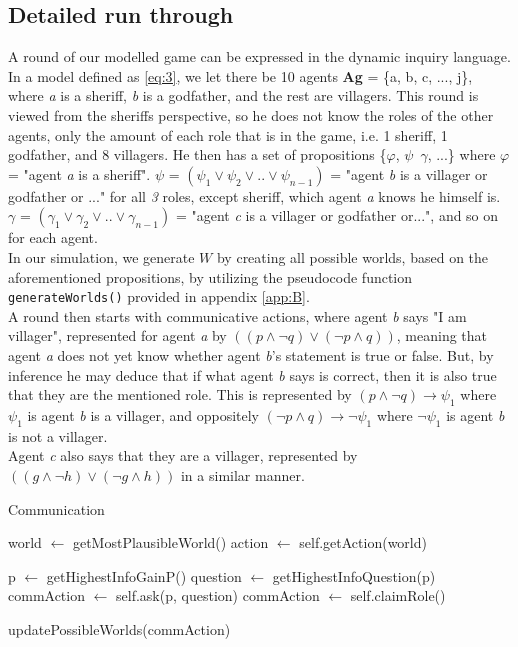 \subsection{Detailed run through}\label{ARoundOfTheGame}
A round of our modelled game can be expressed in the dynamic inquiry language.
In a model defined as \cref{eq:3}, we let there be 10 agents \textbf{Ag} = \{a,
b, c, ..., j\}, where \textit{a} is a sheriff, \textit{b} is a godfather, and
the rest are villagers. This round is viewed from the sheriffs perspective, so
he does not know the roles of the other agents, only the amount of each role
that is in the game, i.e. 1 sheriff, 1 godfather, and 8 villagers. He then has
a set of propositions \{$\varphi$, $\psi$\, $\gamma$, ...\} where $\varphi$ =
"agent \textit{a} is a sheriff". $\psi$ = $(\psi_1 \lor \psi_2 \lor .. \lor
	\psi_{n-1})$ = "agent \textit{b} is a villager or godfather or ..." for all
\textit{3} roles, except sheriff, which agent \textit{a} knows he himself is.
$\gamma$ = $(\gamma_1 \lor \gamma_2 \lor .. \lor \gamma_{n-1}) $ = "agent
\textit{c} is a villager or godfather or...", and so on for each agent. \\ In
our simulation, we generate $W$ by creating all possible worlds, based on the
aforementioned propositions, by utilizing the pseudocode function
\lstinline{generateWorlds()} provided in appendix \ref{app:B}. \\ A round then
starts with communicative actions, where agent \textit{b} says "I am villager",
represented for agent \textit{a} by $((p \land \neg q) \lor (\neg p \land q))$,
meaning that agent \textit{a} does not yet know whether agent \textit{b}'s
statement is true or false. But, by inference he may deduce that if what agent
\textit{b} says is correct, then it is also true that they are the mentioned
role. This is represented by $(p \land \neg q) \rightarrow \psi_1$ where
$\psi_1$ is agent \textit{b} is a villager, and oppositely $(\neg p \land q)
	\rightarrow \neg \psi_1$ where $\neg \psi_1$ is agent \textit{b} is not a
villager. \\ Agent \textit{c} also says that they are a villager, represented
by $((g \land \neg h) \lor (\neg g \land h))$ in a similar manner.

\begin{algorithm}
	\caption{Communication}
	\begin{algorithmic}[1]
		\State world $\gets$ getMostPlausibleWorld()
		\State action $\gets$ self.getAction(world)

		\State p $\gets$ getHighestInfoGainP()
		\State question $\gets$ getHighestInfoQuestion(p)
		\State commAction $\gets$ self.ask(p, question)
		\State commAction $\gets$ self.claimRole()
		\EndIf

		\State updatePossibleWorlds(commAction)
		\EndFunction
	\end{algorithmic}
\end{algorithm}\label{lst:communicate}

